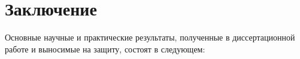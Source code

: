\chapter*{Заключение}

Основные научные и практические результаты, полученные в
диссертационной работе и выносимые на защиту, состоят в следующем:

\Results


